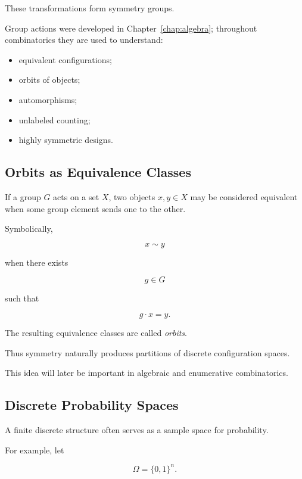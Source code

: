 These transformations form symmetry groups.

Group actions were developed in Chapter~\ref{chap:algebra}; throughout
combinatorics they are used to understand:

\begin{itemize}
    \item equivalent configurations;
    \item orbits of objects;
    \item automorphisms;
    \item unlabeled counting;
    \item highly symmetric designs.
\end{itemize}

\subsection{Orbits as Equivalence Classes}
\label{subsec:orbits-equivalence}

If a group \(G\) acts on a set \(X\), two objects \(x,y\in X\) may be
considered equivalent when some group element sends one to the other.

Symbolically,

\[
x\sim y
\]

when there exists

\[
g\in G
\]

such that

\[
g\cdot x=y.
\]

The resulting equivalence classes are called \emph{orbits}.

Thus symmetry naturally produces partitions of discrete configuration
spaces.

This idea will later be important in algebraic and enumerative
combinatorics.

\subsection{Discrete Probability Spaces}
\label{subsec:discrete-probability-spaces-preview}

A finite discrete structure often serves as a sample space for
probability.

For example, let

\[
\Omega=\{0,1\}^{n}.
\]


